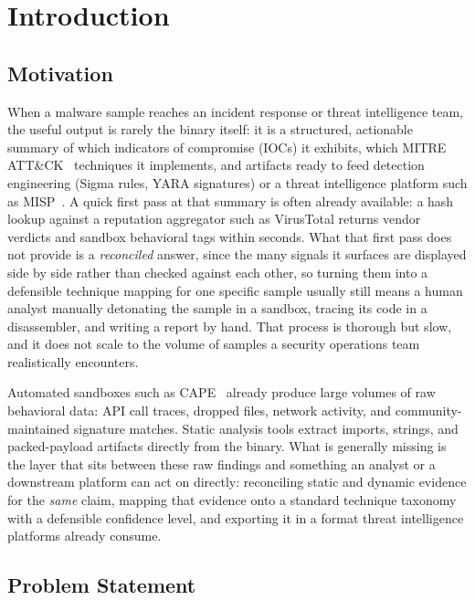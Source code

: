 \section{Introduction}
\label{sec:introduction}

\subsection{Motivation}

When a malware sample reaches an incident response or threat
intelligence team, the useful output is rarely the binary itself: it
is a structured, actionable summary of which indicators of compromise
(IOCs) it exhibits, which MITRE ATT\&CK~\cite{mitre-attack} techniques
it implements, and artifacts ready to feed detection engineering
(Sigma rules, YARA signatures) or a threat intelligence platform such
as MISP~\cite{misp}. A quick first pass at that summary is often
already available: a hash lookup against a reputation aggregator such
as VirusTotal returns vendor verdicts and sandbox behavioral tags
within seconds. What that first pass does not provide is a
\emph{reconciled} answer, since the many signals it surfaces are
displayed side by side rather than checked against each other, so
turning them into a defensible technique mapping for one specific
sample usually still means a human analyst manually detonating the
sample in a sandbox, tracing its code in a disassembler, and writing a
report by hand. That process is thorough but slow, and it does not
scale to the volume of samples a security operations team realistically
encounters.

Automated sandboxes such as CAPE~\cite{cape} already produce large
volumes of raw behavioral data: API call traces, dropped files, network
activity, and community-maintained signature matches. Static analysis
tools extract imports, strings, and packed-payload artifacts directly
from the binary. What is generally missing is the layer that sits
between these raw findings and something an analyst or a downstream
platform can act on directly: reconciling static and dynamic evidence
for the \emph{same} claim, mapping that evidence onto a standard
technique taxonomy with a defensible confidence level, and exporting it
in a format threat intelligence platforms already consume.

\subsection{Problem Statement}

